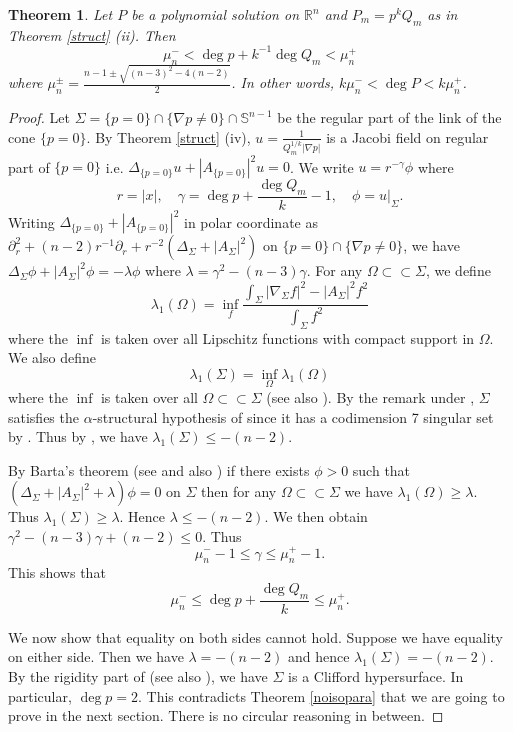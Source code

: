 \documentclass[pdflatex,sn-mathphys-num]{sn-jnl}%
\theoremstyle{thmstyleone}%
\newtheorem{theorem}{Theorem}[section]%
\theoremstyle{thmstyletwo}%
\theoremstyle{thmstylethree}%
\newcommand{\R}{\mathbb{R}}
\newcommand{\SSS}{\mathbb{S}}
\begin{document}
\begin{theorem}\label{n-2}
	Let $P$ be a polynomial solution  on $\R^n$ and $P_m=p^kQ_m$ as in Theorem \ref{struct} (ii). Then 
	\[\mu_n^-< \deg p +k^{-1}\deg Q_m< \mu_n^+\]where
	$\mu_n^{\pm}= \frac{n-1\pm\sqrt{(n-3)^2-4(n-2)}}{2}$. In other words, $k\mu_n^-<\deg P< k\mu_n^+$.
\end{theorem}
\begin{proof}
	Let $\Sigma=\{p=0\}\cap\{\nabla p\neq0\}\cap \SSS^{n-1}$ be the regular part of the link of the cone $\{p=0\}$. By Theorem \ref{struct} (iv), $u=\frac{1}{Q_m^{1/k}|\nabla p|}$ is a Jacobi field on regular part of $\{p=0\}$ i.e. $\Delta_{\{p=0\}}u+|A_{\{p=0\}}|^2u=0$. We write $u=r^{-\gamma}\phi$ where \[r=|x|,\quad \gamma=\deg p+\frac{\deg Q_m}{k}-1,\quad\phi=u|_\Sigma.\]
	Writing $\Delta_{\{p=0\}}+|A_{\{p=0\}}|^2$ in polar coordinate as $\partial_r^2+(n-2)r^{-1}\partial_r+r^{-2}(\Delta_\Sigma +|A_\Sigma|^2)$ on $\{p=0\}\cap\{\nabla p\neq0\}$, we have $\Delta_\Sigma \phi+|A_\Sigma|^2\phi=-\lambda \phi$ where $\lambda=\gamma^2-(n-3)\gamma$. For any $\Omega\subset\subset \Sigma$, we define
	\[\lambda_1(\Omega)=\inf_f \frac{\int_\Sigma |\nabla_\Sigma f|^2-|A_\Sigma|^2f^2}{\int_\Sigma f^2}\]
	where the $\inf$ is taken over all Lipschitz functions with compact support in $\Omega$. We also define 
	\begin{equation}\label{lambda1}
		\lambda_1(\Sigma)=\inf_{\Omega}\lambda_1(\Omega)
	\end{equation} where the $\inf$ is taken over all $\Omega\subset\subset \Sigma$ (see also \cite[(2.8)]{zhu2018first}). By the remark under \cite[Theorem 1.1]{zhu2018first}, $\Sigma$ satisfies the $\alpha$-structural hypothesis of \cite[Theorem 1.1]{zhu2018first} since it has a codimension 7 singular set by \cite{Fed70}. Thus by \cite[Theorem 1.1]{zhu2018first}, we have $\lambda_1(\Sigma)\le -(n-2)$.
	
	By Barta's theorem (see \cite{Barta} and also \cite[Lemma 1.36]{CM}) if there exists $\phi>0$ such that $(\Delta _\Sigma +|A_\Sigma|^2+\lambda)\phi=0$ on $\Sigma$ then for any $\Omega\subset\subset\Sigma$ we have $\lambda_1(\Omega)\ge \lambda$. Thus $\lambda_1(\Sigma)\ge \lambda$. Hence $\lambda\le -(n-2)$. We then obtain $\gamma^2-(n-3)\gamma+(n-2)\le0$. Thus 
	\[\mu_n^--1\le \gamma\le \mu_n^+-1.\] This shows that
	\[\mu_n^-\le\deg p+\frac{\deg Q_m}{k} \le \mu_n^+.\]
	
	We now show that equality on both sides cannot hold. Suppose we have equality on either side. Then we have $\lambda=-(n-2)$ and hence $\lambda_1(\Sigma)=-(n-2)$. By the rigidity part of \cite[Theorem 1.1]{zhu2018first} (see also \cite{perdomo2002first,wu1993new}), we have $\Sigma$ is a Clifford hypersurface. In particular, $\deg p=2$. This contradicts Theorem \ref{noisopara} that we are going to prove in the next section. There is no circular reasoning in between.
\end{proof}
\end{document}
